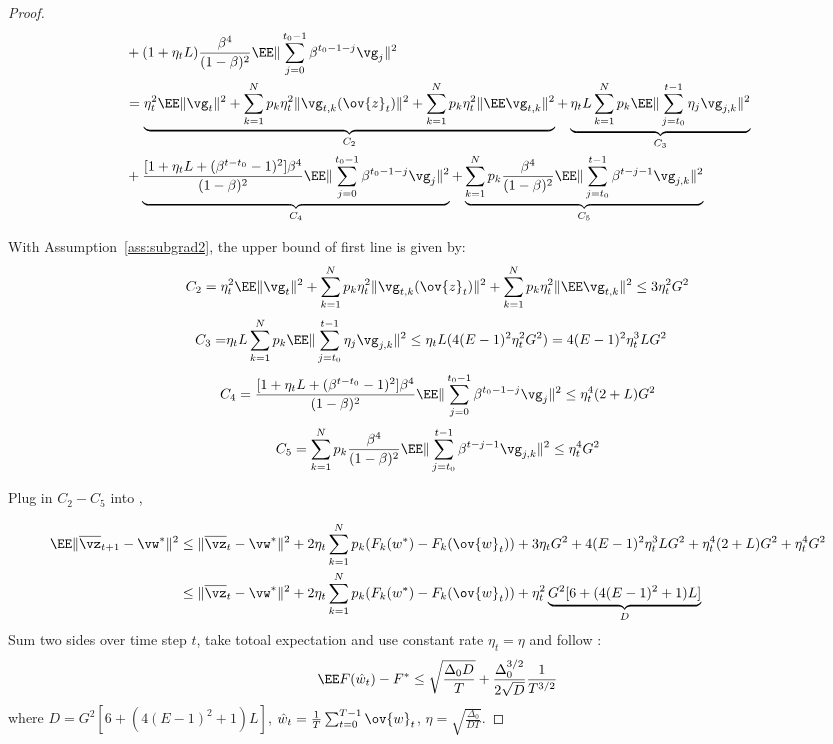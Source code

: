 \begin{proof}
\begin{align*}
  & + (1+ \eta_t L)\frac{\beta^4}{(1-\beta)^2}\EE\|\sum_{j=0}^{t_0 - 1}\beta^{t_0-1-j}\vg_j\|^2 \\
  & = \underbrace{\eta_t^2\EE\|\vg_t\|^2  +  \sum_{k=1}^N p_k \eta_t^2\|\vg_{t,k}(\ov{z}_t)\|^2 + \sum_{k=1}^N p_k\eta_t^2 \|\EE \vg_{t,k}\|^2}_{C_2} + \underbrace{\eta_t L \sum_{k=1}^N p_k \EE \|\sum_{j=t_0}^{t-1}\eta_j \vg_{j,k}\|^2}_{C_3}   \nonumber \\
  & + \underbrace{\frac{[1+ \eta_t L + (\beta^{t-t_0}-1)^2]\beta^4}{(1-\beta)^2}\EE\|\sum_{j=0}^{t_0 - 1}\beta^{t_0-1-j}\vg_j\|^2}_{C_4} + \underbrace{\sum_{k=1}^N p_k\frac{\beta^4}{(1 - \beta)^2} \EE\|\sum_{j=t_0}^{t-1}\beta^{t-j-1}\vg_{j,k}\|^2}_{C_5}   \label{eq:nasgdcvxsm7}
\end{align*}

With Assumption~\ref{ass:subgrad2}, the upper bound of first line is given by:
\begin{align*}
		C_2 = \eta_t^2\EE\|\vg_t\|^2  +  \sum_{k=1}^N p_k \eta_t^2\|\vg_{t,k}(\ov{z}_t)\|^2 + \sum_{k=1}^N p_k\eta_t^2 \|\EE \vg_{t,k}\|^2  	  \leq 3 \eta_t^2 G^2
\end{align*}
\begin{align*}
C_3 =	& \eta_t L \sum_{k=1}^N p_k \EE \|\sum_{j=t_0}^{t-1}\eta_j \vg_{j,k}\|^2  \leq \eta_t L (4 (E-1)^2\eta_t^2 G^2) = 4(E-1)^2\eta_t^3L G^2 
\end{align*}
\begin{align*}
C_4 = 	\frac{[1+ \eta_t L + (\beta^{t-t_0}-1)^2]\beta^4}{(1-\beta)^2}\EE\|\sum_{j=0}^{t_0 - 1}\beta^{t_0-1-j}\vg_j\|^2  \leq \eta_t^4(2 + L) G^2 
\end{align*}
\begin{align*}
	C_5 = \sum_{k=1}^N p_k\frac{\beta^4}{(1 - \beta)^2} \EE\|\sum_{j=t_0}^{t-1}\beta^{t-j-1}\vg_{j,k}\|^2 
	\leq \eta_t^4 G^2
\end{align*}

Plug in $C_2 - C_5$ into \eq{\ref{eq:nasgdcvxsm6}}, 

\begin{align}
	\EE\|\overline{\vz}_{t+1} - \vw^* \|^2 & \leq  \| \overline{\vz}_{t} - \vw^*\|^2 + 2 \eta_{t} \sum_{k=1}^N p_k (F_k(w^*) - F_k(\ov{w}_t))  + 3\eta_t G^2 + 4(E-1)^2\eta_t^3L G^2  +  \eta_t^4(2 + L) G^2  + \eta_t^4 G^2 \\
& \leq  \| \overline{\vz}_{t} - \vw^*\|^2 + 2 \eta_{t} \sum_{k=1}^N p_k (F_k(w^*) - F_k(\ov{w}_t))  + \eta_t^2 \underbrace{G^2[6 + (4(E-1)^2+1)L] }_{D}
\end{align}
Sum two sides over time step $t$, take totoal expectation and use constant rate $\eta_t = \eta$ and follow \eq{\ref{eq:nagcvxc4}}:
\begin{align}
	\EE F(\hat{w}_t) - F^* & \leq \sqrt{\frac{\Delta_0D}{T}} + \frac{\Delta_0^{3/2}}{2\sqrt{D}}\frac{1}{T^{3/2}} \nonumber\\
\end{align}
where $D = G^2[6 + (4(E-1)^2+1)L] $, $\hat{w}_t = \frac{1}{T}\sum_{t=0}^{T-1} \ov{w}_t$, $\eta = \sqrt{\frac{\Delta_0}{DT}}$.


\end{proof}
